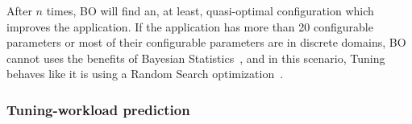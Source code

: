 After $n$ times, BO will find an, at least, quasi-optimal configuration which
improves the application. If the application has more than 20 configurable
parameters or most of their configurable parameters are in discrete domains, BO
cannot uses the benefits of Bayesian Statistics~\cite{?}, and in this scenario,
Tuning behaves like it is using a Random Search optimization~\cite{?}.

\subsubsection{Tuning-workload prediction}

